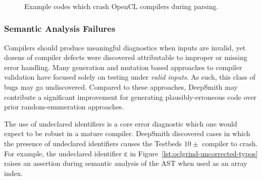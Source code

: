 
\begin{figure}
  \centering %
  \\%
  \\%
  \\%
  \caption[Example codes which crash parsers]{%
    Example codes which crash OpenCL compilers during parsing.%
  }
  \label{lst:parser-crashes}
\end{figure}

\subsubsection{Semantic Analysis Failures}

Compilers should produce meaningful diagnostics when inputs are invalid, yet dozens of compiler defects were discovered attributable to improper or missing error handling. Many generation and mutation based approaches to compiler validation have focused solely on testing under \emph{valid inputs}. As such, this class of bugs may go undiscovered. Compared to these approaches, DeepSmith may contribute a significant improvement for generating plausibly-erroneous code over prior random-enumeration approaches.

The use of undeclared identifiers is a core error diagnostic which one would expect to be robust in a mature compiler. DeepSmith discovered cases in which the presence of undeclared identifiers causes the Testbeds $10\pm$ compiler to crash. For example, the undeclared identifier \texttt{c} in Figure~\ref{lst:oclgrind-uncorrected-typos} raises an assertion during semantic analysis of the AST when used as an array index.

